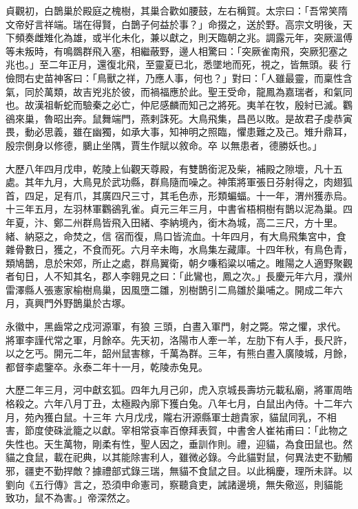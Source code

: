 \begin{pinyinscope}
 貞觀初，白鵲巢於殿庭之槐樹，其巢合歡如腰鼓，左右稱賀。太宗曰：「吾常笑隋文帝好言祥端。瑞在得賢，白鵲子何益於事？」命掇之，送於野。高宗文明後，天下頻奏雌雉化為雄，或半化未化，兼以獻之，則天臨朝之兆。調露元年，突厥溫傅等未叛時，有鳴鵽群飛入塞，相繼蔽野，邊人相驚曰：「突厥雀南飛，突厥犯塞之兆也。」至二年正月，還復北飛，至靈夏已北，悉墜地而死，視之，皆無頭。裴
 行儉問右史苗神客曰：「鳥獸之祥，乃應人事，何也？」對曰：「人雖最靈，而稟性含氣，同於萬類，故吉兇兆於彼，而禍福應於此。聖王受命，龍鳳為嘉瑞者，和氣同也。故漢祖斬蛇而驗秦之必亡，仲尼感麟而知己之將死。夷羊在牧，殷紂已滅。鸜鵒來巢，魯昭出奔。鼠舞端門，燕剌誅死。大鳥飛集，昌邑以敗。是故君子虔恭寅畏，動必思義，雖在幽獨，如承大事，知神明之照臨，懼患難之及己。雉升鼎耳，殷宗側身以修德，鵩止坐隅，賈生作賦以敘命。卒
 以無患者，德勝妖也。」



 大歷八年四月戊申，乾陵上仙觀天尊殿，有雙鵲銜泥及柴，補殿之隙壞，凡十五處。其年九月，大鳥見於武功縣，群鳥隨而噪之。神策將軍張日芬射得之，肉翅狐首，四足，足有爪，其廣四尺三寸，其毛色赤，形類蝙蝠。十一年，渭州獲赤烏。十三年五月，左羽林軍鸜鵒乳雀。貞元三年三月，中書省梧桐樹有鵲以泥為巢。四年夏，汴、鄭二州群鳥皆飛入田緒、李納境內，銜木為城，高二三尺，方十里。緒、納惡之，命焚之，信
 宿而復，鳥口皆流血。十年四月，有大鳥飛集宮中，食雜骨數日，獲之，不食而死。六月辛未晦，水鳥集左藏庫。十四年秋，有鳥色青，類鳩鵲，息於宋郊，所止之處，群鳥翼衛，朝夕嗛稻粱以哺之。睢陽之人適野聚觀者旬日，人不知其名，郡人李翱見之曰：「此鸞也，鳳之次。」長慶元年六月，濮州雷澤縣人張憲家榆樹鳥巢，因風墮二雛，別樹鵲引二鳥雛於巢哺之。開成二年六月，真興門外野鵲巢於古塚。



 永徽中，黑齒常之戍河源軍，有狼
 三頭，白晝入軍門，射之斃。常之懼，求代。將軍李謹代常之軍，月餘卒。先天初，洛陽市人牽一羊，左肋下有人手，長尺許，以之乞丐。開元二年，韶州鼠害稼，千萬為群。三年，有熊白晝入廣陵城，月餘，都督李處鑒卒。永泰二年十一月，乾陵赤兔見。



 大歷二年三月，河中獻玄狐。四年九月己卯，虎入京城長壽坊元載私廟，將軍周皓格殺之。六年八月丁丑，太極殿內廓下獲白兔。八年七月，白鼠出內侍。十二年六月，苑內獲白鼠。十三年
 六月戊戌，隴右汧源縣軍士趙貴家，貓鼠同乳，不相害，節度使硃泚籠之以獻。宰相常袞率百僚拜表賀，中書舍人崔祐甫曰：「此物之失性也。天生萬物，剛柔有性，聖人因之，垂訓作則。禮，迎貓，為食田鼠也。然貓之食鼠，載在祀典，以其能除害利人，雖微必錄。今此貓對鼠，何異法吏不勤觸邪，疆吏不勤捍敵？據禮部式錄三瑞，無貓不食鼠之目。以此稱慶，理所未詳。以劉向《五行傳》言之，恐須申命憲司，察聽貪吏，誡諸邊境，無失儆巡，則貓能
 致功，鼠不為害。」帝深然之。




\end{pinyinscope}
